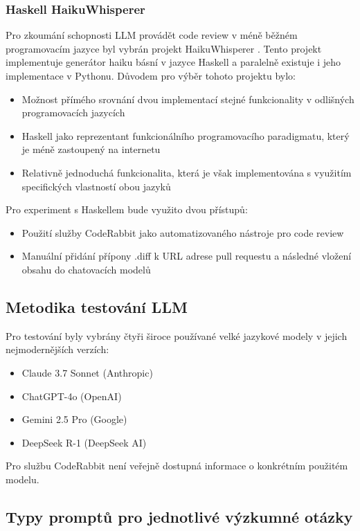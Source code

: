\documentclass[12pt, a4paper]{article}
\begin{document}
\subsubsection{Haskell HaikuWhisperer}
Pro zkoumání schopnosti LLM provádět code review v méně běžném programovacím jazyce byl vybrán projekt HaikuWhisperer \cite{pospisil2025haiku}. Tento projekt implementuje generátor haiku básní v jazyce Haskell a paralelně existuje i jeho implementace v Pythonu. Důvodem pro výběr tohoto projektu bylo:
\begin{itemize}
\item Možnost přímého srovnání dvou implementací stejné funkcionality v odlišných programovacích jazycích
\item Haskell jako reprezentant funkcionálního programovacího paradigmatu, který je méně zastoupený na internetu
\item Relativně jednoduchá funkcionalita, která je však implementována s využitím specifických vlastností obou jazyků
\end{itemize}
Pro experiment s Haskellem bude využito dvou přístupů:
\begin{itemize}
\item Použití služby CodeRabbit jako automatizovaného nástroje pro code review
\item Manuální přidání přípony .diff k URL adrese pull requestu a následné vložení obsahu do chatovacích modelů
\end{itemize}
\subsection{Metodika testování LLM}
Pro testování byly vybrány čtyři široce používané velké jazykové modely v jejich nejmodernějších verzích:
\begin{itemize}
\item Claude 3.7 Sonnet (Anthropic) \cite{claude2025}
\item ChatGPT-4o (OpenAI) \cite{chatgpt2025}
\item Gemini 2.5 Pro (Google) \cite{gemini2025}
\item DeepSeek R-1 (DeepSeek AI) \cite{deepseek2025}
\end{itemize}
Pro službu CodeRabbit není veřejně dostupná informace o konkrétním použitém modelu.
\subsection{Typy promptů pro jednotlivé výzkumné otázky}
\end{document}
